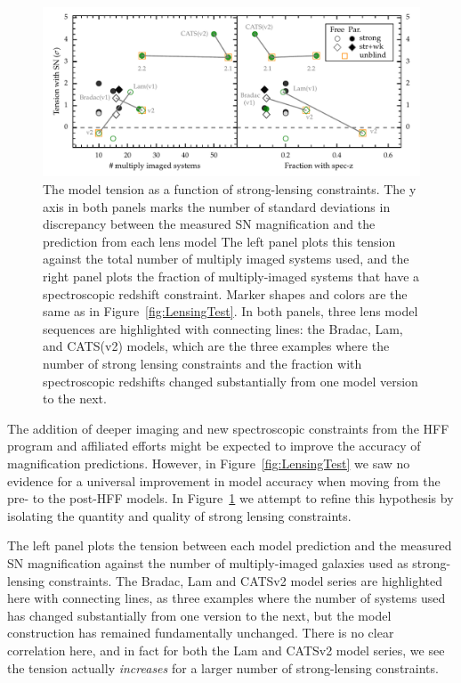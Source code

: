 \begin{figure}
\begin{center}
\includegraphics[width=\textwidth]{tension}
\caption{ \label{fig:Nspecz}
The model tension as a function of strong-lensing constraints. The y
axis in both panels marks the number of standard deviations in
discrepancy between the measured SN magnification and the prediction
from each lens model  The left panel plots this tension against the
total number of multiply imaged systems used, and the right panel
plots the fraction of
multiply-imaged systems that have a spectroscopic redshift
constraint.  Marker shapes and colors are the same as in
Figure~\ref{fig:LensingTest}.  In both panels, three lens model sequences are highlighted with connecting lines: the Bradac, Lam, and CATS(v2) models, which are the three examples where the number of strong lensing constraints and the fraction with spectroscopic redshifts changed substantially from one model version to the next.}
\end{center}
\end{figure}

The addition of deeper imaging and new spectroscopic constraints from
the HFF program and affiliated efforts might be expected to improve
the accuracy of magnification predictions. However, in
Figure~\ref{fig:LensingTest} we saw no evidence for a universal
improvement in model accuracy when moving from the pre- to the
post-HFF models.  In Figure~\ref{fig:Nspecz} we attempt to refine this
hypothesis by isolating the quantity and quality of strong lensing constraints. 

The left panel plots the tension between each model prediction and the
measured SN magnification against the number of multiply-imaged
galaxies used as strong-lensing constraints. The Bradac, Lam and
CATSv2 model series are highlighted here with connecting lines, as
three examples where the number of systems used has changed
substantially from one version to the next, but the model construction
has remained fundamentally unchanged.
There is no clear correlation here, and in
fact for both the Lam and CATSv2 model series, we see the tension
actually {\it increases} for a larger number of strong-lensing constraints.


